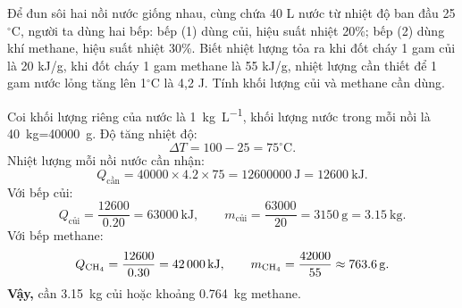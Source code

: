 \begin{tuluyen}
Để đun sôi hai nồi nước giống nhau, cùng chứa 40 L nước từ nhiệt độ ban đầu 25$^\circ$C, người ta dùng hai bếp: bếp (1) dùng củi, hiệu suất nhiệt 20\%; bếp (2) dùng khí methane, hiệu suất nhiệt 30\%. Biết nhiệt lượng tỏa ra khi đốt cháy 1 gam củi là 20 kJ/g, khi đốt cháy 1 gam methane là 55 kJ/g, nhiệt lượng cần thiết để 1 gam nước lỏng tăng lên 1$^\circ$C là 4,2 J. Tính khối lượng củi và methane cần dùng.
\begin{loigiaiBT}
Coi khối lượng riêng của nước là \SI{1}{\kilo\gram\per\liter}, khối lượng nước trong mỗi nồi là \SI{40}{\kilo\gram}=\SI{40000}{\gram}. Độ tăng nhiệt độ:
\[
\Delta T=100-25=75^\circ\mathrm{C}.
\]
Nhiệt lượng mỗi nồi nước cần nhận:
\[
Q_{\text{cần}}=40000\times4.2\times75=\SI{12600000}{\joule}=\SI{12600}{\kilo\joule}.
\]
Với bếp củi:
\[
Q_{\text{củi}}=\frac{12600}{0.20}=\SI{63000}{\kilo\joule},\qquad
m_{\text{củi}}=\frac{63000}{20}=\SI{3150}{\gram}=\SI{3.15}{\kilo\gram}.
\]
Với bếp methane:
\[
Q_{\ce{CH4}}=\frac{12600}{0.30}=\SI{42000}{\kilo\joule},\qquad
m_{\ce{CH4}}=\frac{42000}{55}\approx\SI{763.6}{\gram}.
\]
\textbf{Vậy,} cần \SI{3.15}{\kilo\gram} củi hoặc khoảng \SI{0.764}{\kilo\gram} methane.
\end{loigiaiBT}
\end{tuluyen}
